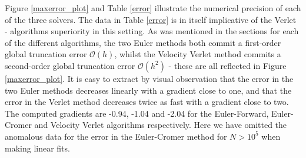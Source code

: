 	Figure \ref{maxerror_plot} and Table \ref{error} illustrate the numerical precision of each of the three solvers. The data in Table \ref{error} is in itself implicative of the Verlet - algorithms superiority in this setting. As was mentioned in the sections for each of the different algorithms, the two Euler methods both commit a first-order global truncation error $\mathcal{O}(h)$, whilst the Velocity Verlet method commits a second-order global truncation error $\mathcal{O}(h^2)$ - these are all reflected in Figure \ref{maxerror_plot}. It is easy to extract by visual observation that the error in the two Euler methods decreases linearly with a gradient close to one, and that the error in the Verlet method decreases twice as fast with a gradient close to two. The computed gradients are -0.94, -1.04 and -2.04 for the Euler-Forward, Euler-Cromer and Velocity Verlet algorithms respectively. Here we have omitted the anomalous data for the error in the Euler-Cromer method for $N > 10^5$ when making linear fits.\\ 

